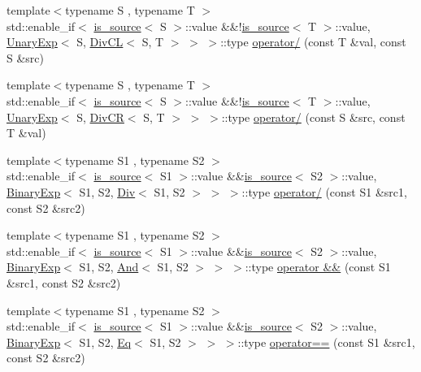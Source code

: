 \begin{DoxyCompactItemize}
\item 
{\footnotesize template$<$typename S , typename T $>$ }\\std\+::enable\+\_\+if$<$ \hyperlink{classshark_1_1ndim_1_1is__source}{is\+\_\+source}$<$ S $>$\+::value \&\&!\hyperlink{classshark_1_1ndim_1_1is__source}{is\+\_\+source}$<$ T $>$\+::value, \hyperlink{classshark_1_1ndim_1_1_unary_exp}{Unary\+Exp}$<$ S, \hyperlink{classshark_1_1ndim_1_1_div_c_l}{Div\+CL}$<$ S, T $>$ $>$ $>$\+::type \hyperlink{namespaceshark_1_1ndim_a2cb8f6e837e4b1d3d8b8b56ced78b745}{operator/} (const T \&val, const S \&src)
\item 
{\footnotesize template$<$typename S , typename T $>$ }\\std\+::enable\+\_\+if$<$ \hyperlink{classshark_1_1ndim_1_1is__source}{is\+\_\+source}$<$ S $>$\+::value \&\&!\hyperlink{classshark_1_1ndim_1_1is__source}{is\+\_\+source}$<$ T $>$\+::value, \hyperlink{classshark_1_1ndim_1_1_unary_exp}{Unary\+Exp}$<$ S, \hyperlink{classshark_1_1ndim_1_1_div_c_r}{Div\+CR}$<$ S, T $>$ $>$ $>$\+::type \hyperlink{namespaceshark_1_1ndim_a04db7e72d5f7d75e493d397e6ee1b973}{operator/} (const S \&src, const T \&val)
\item 
{\footnotesize template$<$typename S1 , typename S2 $>$ }\\std\+::enable\+\_\+if$<$ \hyperlink{classshark_1_1ndim_1_1is__source}{is\+\_\+source}$<$ S1 $>$\+::value \&\&\hyperlink{classshark_1_1ndim_1_1is__source}{is\+\_\+source}$<$ S2 $>$\+::value, \hyperlink{classshark_1_1ndim_1_1_binary_exp}{Binary\+Exp}$<$ S1, S2, \hyperlink{classshark_1_1ndim_1_1_div}{Div}$<$ S1, S2 $>$ $>$ $>$\+::type \hyperlink{namespaceshark_1_1ndim_a1116e694b5847cfeee2bbd30f6451659}{operator/} (const S1 \&src1, const S2 \&src2)
\item 
{\footnotesize template$<$typename S1 , typename S2 $>$ }\\std\+::enable\+\_\+if$<$ \hyperlink{classshark_1_1ndim_1_1is__source}{is\+\_\+source}$<$ S1 $>$\+::value \&\&\hyperlink{classshark_1_1ndim_1_1is__source}{is\+\_\+source}$<$ S2 $>$\+::value, \hyperlink{classshark_1_1ndim_1_1_binary_exp}{Binary\+Exp}$<$ S1, S2, \hyperlink{classshark_1_1ndim_1_1_and}{And}$<$ S1, S2 $>$ $>$ $>$\+::type \hyperlink{namespaceshark_1_1ndim_a78f5768d2fcffe7803b9422aa1333670}{operator \&\&} (const S1 \&src1, const S2 \&src2)
\item 
{\footnotesize template$<$typename S1 , typename S2 $>$ }\\std\+::enable\+\_\+if$<$ \hyperlink{classshark_1_1ndim_1_1is__source}{is\+\_\+source}$<$ S1 $>$\+::value \&\&\hyperlink{classshark_1_1ndim_1_1is__source}{is\+\_\+source}$<$ S2 $>$\+::value, \hyperlink{classshark_1_1ndim_1_1_binary_exp}{Binary\+Exp}$<$ S1, S2, \hyperlink{classshark_1_1ndim_1_1_eq}{Eq}$<$ S1, S2 $>$ $>$ $>$\+::type \hyperlink{namespaceshark_1_1ndim_a1e0a8ad9243246f1ae0965ff1386b0db}{operator==} (const S1 \&src1, const S2 \&src2)

\end{DoxyCompactItemize}
